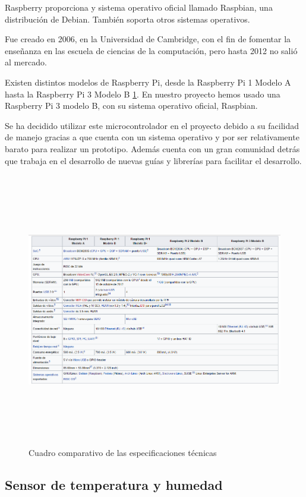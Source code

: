 Raspberry proporciona y sistema operativo oficial llamado Raspbian, una distribución de Debian. También soporta otros sistemas operativos.
 
Fue creado en 2006, en la Universidad de Cambridge, con el fin de fomentar la enseñanza en las escuela de ciencias de la computación, pero hasta 2012 no salió al mercado.

Existen distintos modelos de Raspberry Pi, desde la Raspberry Pi 1 Modelo A hasta la Raspberry Pi 3 Modelo B \ref{types}.
En nuestro proyecto hemos usado una Raspberry Pi 3 modelo B, con su sistema operativo oficial, Raspbian.

Se ha decidido utilizar este microcontrolador en el proyecto debido a su facilidad de manejo gracias a que cuenta con un sistema operativo y por ser relativamente barato para realizar un prototipo. Además cuenta con un gran comunidad detrás que trabaja en el desarrollo de nuevas guías y librerías para facilitar el desarrollo. 

\begin{figure}[htb]
	\begin{center}
		\includegraphics[width=17cm,height=12cm]{figures/Cuadro_Tipos_Raspberry.png}
		\caption{Cuadro comparativo de las especificaciones técnicas}
	\end{center}

	\label{types}
\end{figure}

\subsection*{Sensor de temperatura y humedad}

